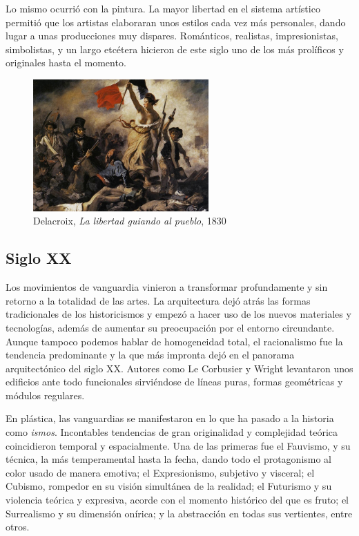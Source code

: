 Lo mismo ocurrió con la pintura. La mayor libertad en el sistema artístico permitió que los artistas elaboraran unos estilos cada vez más personales, dando lugar a unas producciones muy dispares. Románticos, realistas, impresionistas, simbolistas, y un largo etcétera hicieron de este siglo uno de los más prolíficos y originales hasta el momento.

\begin{figure}[!h]
    \begin{center}
        \includegraphics[width=0.6\textwidth]{imagenes/2/libertad-guiando.jpg}
        \caption{Delacroix, \textit{La libertad guiando al pueblo}, 1830}
        \label{fig:libertdad-guiando-pueblo}
    \end{center}
\end{figure}

\subsection{Siglo XX}

Los movimientos de vanguardia vinieron a transformar profundamente y sin retorno a la totalidad de las artes. La arquitectura dejó atrás las formas tradicionales de los historicismos y empezó a hacer uso de los nuevos materiales y tecnologías, además de aumentar su preocupación por el entorno circundante. Aunque tampoco podemos hablar de homogeneidad total, el racionalismo fue la tendencia predominante y la que más impronta dejó en el panorama arquitectónico del siglo XX. Autores como Le Corbusier y Wright levantaron unos edificios ante todo funcionales sirviéndose de líneas puras, formas geométricas y módulos regulares.

En plástica, las vanguardias se manifestaron en lo que ha pasado a la historia como \textit{ismos}. Incontables tendencias de gran originalidad y complejidad teórica coincidieron temporal y espacialmente. Una de las primeras fue el Fauvismo, y su técnica, la más temperamental hasta la fecha, dando todo el protagonismo al color usado de manera emotiva; el Expresionismo, subjetivo y visceral; el Cubismo, rompedor en su visión simultánea de la realidad; el Futurismo y su violencia teórica y expresiva, acorde con el momento histórico del que es fruto; el Surrealismo y su dimensión onírica; y la abstracción en todas sus vertientes, entre otros.

